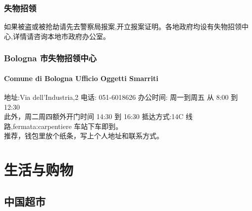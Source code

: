 \documentclass[3pt,a5paper,openright,twoside]{book}
\begin{document}
\subsection{失物招领}
如果被盗或被抢劫请先去警察局报案,开立报案证明。各地政府均设有失物招领中心,详情请咨询本地市政府办公室。

\subsection{Bologna 市失物招领中心}
\subsubsection{Comune di Bologna Ufficio Oggetti Smarriti}
地址:Via dell’Industria,2 电话: 051-6018626 办公时间: 周一到周五 从 8:00 到 12:30 \\
此外，周二周四额外开门时间 14:30 到 16:30 抵达方式:14C 线路,fermata:carpentiere 车站下车即到。 \\
推荐，钱包里放个纸条，写上个人地址和联系方式。


% 
%
%
%
\chapter{生活与购物}              



\section{中国超市}
\end{document}
